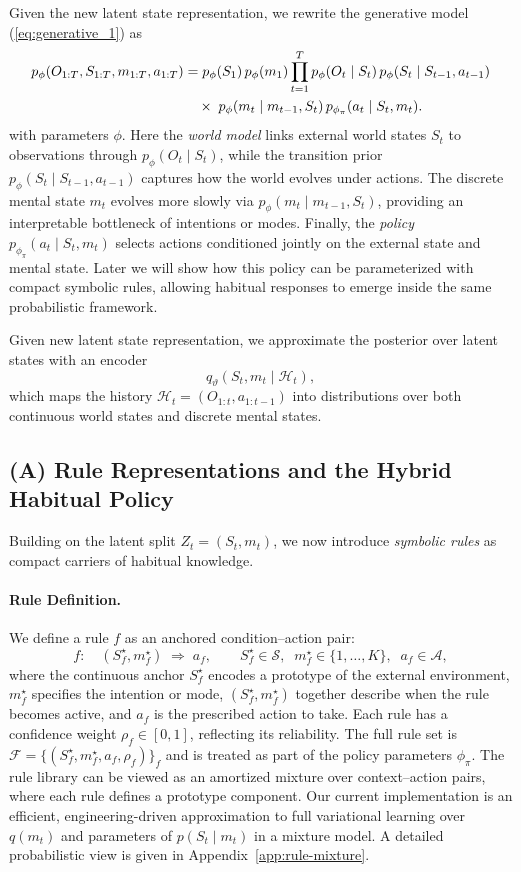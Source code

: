 \documentclass{article} %
\newcommand{\revise}[1]{#1}
\begin{document}
Given the new latent state representation, we rewrite the generative model (\ref{eq:generative_1}) as
{\small
\begin{align}
p_\phi(O_{1:T}, S_{1:T}, m_{1:T}, \revise{a_{1:T}})
&= \revise{p_\phi(S_1)\, p_\phi(m_1)}
\prod_{t=1}^T 
    p_\phi(O_t \mid S_t)\,
    p_\phi(S_t \mid S_{t-1}, a_{t-1}) \notag\\
&\quad \times\;
    p_\phi(m_t \mid m_{t-1}, S_t)\,
    p_{\phi_{\pi}}(a_t \mid S_t, m_t).
\end{align}
}
with parameters \(\phi\). Here the \emph{world model} links external world states \(S_t\) to observations through \(p_\phi(O_t\mid S_t)\), while the transition prior \(p_\phi(S_t\mid S_{t-1},a_{t-1})\) captures how the world evolves under actions.  
The discrete mental state \(m_t\) evolves more slowly via \(p_\phi(m_t\mid m_{t-1},S_t)\), providing an interpretable bottleneck of intentions or modes.  
Finally, the \emph{policy} \(p_{\phi_{\pi}}(a_t\mid S_t,m_t)\) selects actions conditioned jointly on the external state and mental state. Later we will show how this policy can be parameterized with compact symbolic rules, allowing habitual responses to emerge inside the same probabilistic framework.  

Given new latent state representation, we approximate the posterior over latent states with an encoder
{\small \[
q_\vartheta(S_t,m_t\mid \mathcal H_t),
\]}
which maps the history \(\mathcal H_t=(O_{1:t},a_{1:t-1})\) into distributions over both continuous world states and discrete mental states.
\subsection{(A) Rule Representations and the Hybrid Habitual Policy}
\label{subsec:rules_policy}

Building on the latent split \(Z_t=(S_t,m_t)\), we now introduce \emph{symbolic rules} as compact carriers of habitual knowledge.  
\paragraph{Rule Definition.}
We define a rule \(f\) as an anchored condition–action pair:
{\small \[
f:\quad (S_f^\star, m_f^\star)\;\Rightarrow\; a_f,
\qquad S_f^\star \in \mathcal S,\;\; m_f^\star \in \{1,\dots,K\},\;\; a_f \in \mathcal A,
\]}
where the continuous anchor $S_f^\star$ encodes a prototype of the external environment, 
$m_f^\star$ specifies the intention or mode, $(S_f^\star, m_f^\star)$ together describe when the rule becomes active, and \(a_f\) is the prescribed action to take.   
Each rule has a confidence weight \(\rho_f \in [0,1]\), reflecting its reliability. 
The full rule set is
$
\mathcal{F}=\{(S_f^\star, m_f^\star, a_f, \rho_f)\}_f
$
and is treated as part of the policy parameters \(\phi_\pi\). \revise{The rule library can be viewed as an amortized mixture over context--action pairs, where each rule defines a prototype component. Our current implementation is an efficient, engineering-driven approximation to full variational learning over $q(m_t)$ and parameters of $p(S_t \mid m_t)$ in a mixture model. A detailed probabilistic view is given in Appendix~\ref{app:rule-mixture}.}
\end{document}
